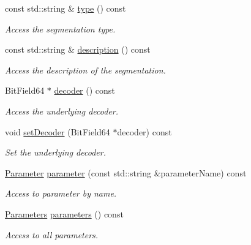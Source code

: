 \begin{DoxyCompactItemize}
const std::string \& \hyperlink{class_d_d4hep_1_1_geometry_1_1_segmentation_object_abbf94d0c2dc6014127573a8b8c93d2d8}{type} () const 
\begin{DoxyCompactList}\small\item\em Access the segmentation type. \item\end{DoxyCompactList}\item 
const std::string \& \hyperlink{class_d_d4hep_1_1_geometry_1_1_segmentation_object_aaee5396e4d743bb2df49c381cc0a766b}{description} () const 
\begin{DoxyCompactList}\small\item\em Access the description of the segmentation. \item\end{DoxyCompactList}\item 
BitField64 $\ast$ \hyperlink{class_d_d4hep_1_1_geometry_1_1_segmentation_object_a1fb5b783285a54fb554a5312c0cfebcc}{decoder} () const 
\begin{DoxyCompactList}\small\item\em Access the underlying decoder. \item\end{DoxyCompactList}\item 
void \hyperlink{class_d_d4hep_1_1_geometry_1_1_segmentation_object_a537aadc3926ed058ac98d8c6fae2d3fb}{setDecoder} (BitField64 $\ast$decoder) const 
\begin{DoxyCompactList}\small\item\em Set the underlying decoder. \item\end{DoxyCompactList}\item 
\hyperlink{class_d_d4hep_1_1_d_d_segmentation_1_1_segmentation_parameter}{Parameter} \hyperlink{class_d_d4hep_1_1_geometry_1_1_segmentation_object_a5b3ad09c737314600b6c8b3c41bdb9a9}{parameter} (const std::string \&parameterName) const 
\begin{DoxyCompactList}\small\item\em Access to parameter by name. \item\end{DoxyCompactList}\item 
\hyperlink{class_d_d4hep_1_1_geometry_1_1_segmentation_object_adb4bb039e0cd15ea9fbe0232d07c49cc}{Parameters} \hyperlink{class_d_d4hep_1_1_geometry_1_1_segmentation_object_a1ca8bae37e4cb457192779046717aa19}{parameters} () const 
\begin{DoxyCompactList}\small\item\em Access to all parameters. \item\end{DoxyCompactList}\item 

\end{DoxyCompactItemize}
